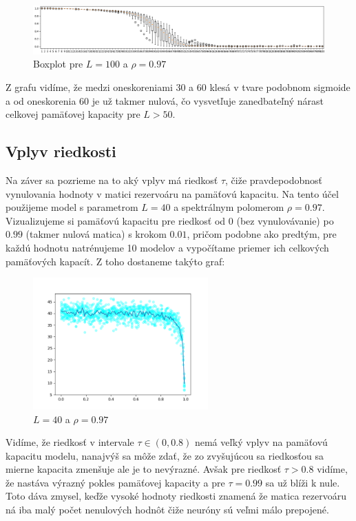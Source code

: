 \documentclass[a4paper]{article}
\begin{document}
	\begin{figure}[!h]
		\centering
		\includegraphics[width=\textwidth]{../box_L_100.png}
		\caption{Boxplot pre $L=100$ a $\rho=0.97$}
	\end{figure}
	
	Z grafu vidíme, že medzi oneskoreniami 30 a 60 klesá v tvare podobnom sigmoide a od oneskorenia 60 je už takmer nulová, čo vysvetľuje zanedbateľný nárast celkovej pamäťovej kapacity pre $L>50$.
	
	\subsection*{Vplyv riedkosti}
	
	Na záver sa pozrieme na to aký vplyv má riedkosť $\tau$, čiže pravdepodobnosť vynulovania hodnoty v matici rezervoáru na pamäťovú kapacitu. Na tento účel použijeme model s parametrom $L=40$ a spektrálnym polomerom $\rho=0.97$. Vizualizujeme si pamäťovú kapacitu pre riedkosť od $0$ (bez vynulovávanie) po $0.99$ (takmer nulová matica) s krokom $0.01$, pričom podobne ako predtým, pre každú hodnotu natrénujeme 10 modelov a vypočítame priemer ich celkových pamäťových kapacít. Z toho dostaneme takýto graf:
	
	\begin{figure}[!h]
		\centering
		\includegraphics[width=0.6\textwidth]{../spars_L_100.png}
		\caption{$L=40$ a $\rho=0.97$}
	\end{figure}
	
	Vidíme, že riedkosť v intervale $\tau \in (0, 0.8)$ nemá veľký vplyv na pamäťovú kapacitu modelu, nanajvýš sa môže zdať, že zo zvyšujúcou sa riedkosťou sa mierne kapacita zmenšuje ale je to nevýrazné. Avšak pre riedkosť $\tau > 0.8$ vidíme, že nastáva výrazný pokles pamäťovej kapacity a pre $\tau = 0.99$ sa už blíži k nule. Toto dáva zmysel, keďže vysoké hodnoty riedkosti znamená že matica rezervoáru ná iba malý počet nenulových hodnôt čiže neuróny sú veľmi málo prepojené. 
	
\end{document}
